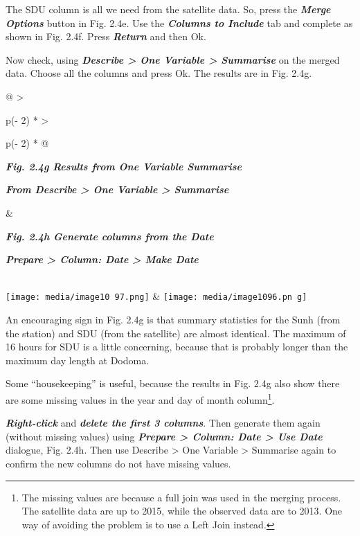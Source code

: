 \documentclass[
  letterpaper,
  DIV=11,
  numbers=noendperiod]{scrreprt}
\begin{document}
The SDU column is all we need from the satellite data. So, press the
\textbf{\emph{Merge Options}} button in Fig. 2.4e. Use the
\textbf{\emph{Columns to Include}} tab and complete as shown in Fig.
2.4f. Press \textbf{\emph{Return}} and then Ok.

Now check, using \textbf{\emph{Describe \textgreater{} One Variable
\textgreater{} Summarise}} on the merged data. Choose all the columns
and press Ok. The results are in Fig. 2.4g.

\begin{longtable}[]{@{}
  >{\raggedright\arraybackslash}p{(\columnwidth - 2\tabcolsep) * }
  >{\raggedright\arraybackslash}p{(\columnwidth - 2\tabcolsep) * }@{}}
\toprule\noalign{}
\begin{minipage}[b]{\linewidth}\raggedright
\textbf{\emph{Fig. 2.4g Results from One Variable Summarise}}

\textbf{\emph{From Describe \textgreater{} One Variable \textgreater{}
Summarise}}
\end{minipage} & \begin{minipage}[b]{\linewidth}\raggedright
\textbf{\emph{Fig. 2.4h Generate columns from the Date}}

\textbf{\emph{Prepare \textgreater{} Column: Date \textgreater{} Make
Date}}
\end{minipage} \\
\midrule\noalign{}
\endhead
\bottomrule\noalign{}
\endlastfoot
\texttt{[image: media/image10 97.png]}
&
\texttt{[image: media/image1096.pn g]} \\
\end{longtable}

An encouraging sign in Fig. 2.4g is that summary statistics for the Sunh
(from the station) and SDU (from the satellite) are almost identical.
The maximum of 16 hours for SDU is a little concerning, because that is
probably longer than the maximum day length at Dodoma.

Some ``housekeeping'' is useful, because the results in Fig. 2.4g also
show there are some missing values in the year and day of month
column\footnote{The missing values are because a full join was used in
  the merging process. The satellite data are up to 2015, while the
  observed data are to 2013. One way of avoiding the problem is to use a
  Left Join instead.}.

\textbf{\emph{Right-click}} and \textbf{\emph{delete the first 3
columns}}. Then generate them again (without missing values) using
\textbf{\emph{Prepare \textgreater{} Column: Date \textgreater{} Use
Date}} dialogue, Fig. 2.4h. Then use Describe \textgreater{} One
Variable \textgreater{} Summarise again to confirm the new columns do
not have missing values.
\end{document}
